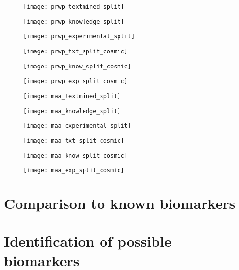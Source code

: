 \begin{figure}
    \label{fig:txt-iref-prwp}
    \texttt{[image: prwp\_textmined\_split]}
\end{figure}
\begin{figure}
    \label{fig:know-iref-prwp}
    \texttt{[image: prwp\_knowledge\_split]}
\end{figure}
\begin{figure}
    \label{fig:exp-iref-prwp}
    \texttt{[image: prwp\_experimental\_split]}
\end{figure}
\begin{figure}
    \label{fig:txt-cosmic-prwp}
    \texttt{[image: prwp\_txt\_split\_cosmic]}
\end{figure}
\begin{figure}
    \label{fig:know-cosmic-prwp}
    \texttt{[image: prwp\_know\_split\_cosmic]}
\end{figure}
\begin{figure}
    \label{fig:exp-cosmic-prwp}
    \texttt{[image: prwp\_exp\_split\_cosmic]}
\end{figure}

\begin{figure}
    \label{fig:txt-iref-maa}
    \texttt{[image: maa\_textmined\_split]}
\end{figure}
\begin{figure}
    \label{fig:know-iref-maa}
    \texttt{[image: maa\_knowledge\_split]}
\end{figure}
\begin{figure}
    \label{fig:exp-iref-maa}
    \texttt{[image: maa\_experimental\_split]}
\end{figure}
\begin{figure}
    \label{fig:txt-cosmic-maa}
    \texttt{[image: maa\_txt\_split\_cosmic]}
\end{figure}
\begin{figure}
    \label{fig:know-cosmic-maa}
    \texttt{[image: maa\_know\_split\_cosmic]}
\end{figure}
\begin{figure}
    \label{fig:exp-cosmic-maa}
    \texttt{[image: maa\_exp\_split\_cosmic]}
\end{figure}

\section{Comparison to known biomarkers}
\section{Identification of possible biomarkers}
